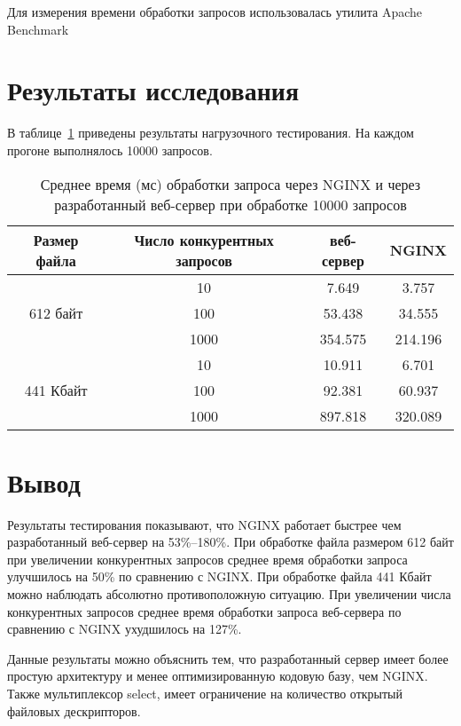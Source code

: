 Для измерения времени обработки запросов использовалась утилита Apache Benchmark~\cite{ab}

\section{Результаты исследования}

В таблице~\ref{tbl:experiment1} приведены результаты нагрузочного тестирования. На каждом прогоне выполнялось 10000 запросов.

\begin{table}[H]
	\centering
	\captionsetup{justification=raggedleft, singlelinecheck=false}
	\caption{Среднее время (мс) обработки запроса через NGINX и через разработанный веб-сервер при обработке 10000 запросов}
	\label{tbl:experiment1}
	\begin{tabular}{|c|c|c|c|} 
		\hline
		Размер файла&Число конкурентных запросов&веб-сервер& NGINX\\\hline
		\multirow{3}{*}{612 байт}	&10&7.649&3.757\\\cline{2-4}
		&100&53.438&34.555\\\cline{2-4}
		&1000&354.575&214.196\\\hline
		\multirow{3}{*}{441 Кбайт}	&10&10.911 &6.701\\\cline{2-4}
		&100&92.381&60.937\\\cline{2-4}
		&1000&897.818&320.089\\\hline

		
	\end{tabular}
\end{table}

\section{Вывод}

Результаты тестирования показывают, что NGINX работает быстрее чем разработанный веб-сервер на 53\%--180\%. При обработке файла размером 612 байт при увеличении конкурентных запросов среднее время обработки запроса улучшилось на 50\% по сравнению с NGINX. При обработке файла 441 Кбайт можно наблюдать абсолютно противоположную ситуацию. При увеличении числа конкурентных запросов среднее время обработки запроса веб-сервера по сравнению с NGINX ухудшилось на 127\%.

Данные результаты можно объяснить тем, что разработанный сервер имеет более простую архитектуру и менее оптимизированную кодовую базу, чем NGINX. Также мультиплексор select, имеет ограничение на количество открытый файловых дескрипторов.


